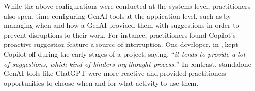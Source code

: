 
While the above configurations were conducted at the systems-level, practitioners also spent time configuring GenAI tools at the application level, such as by managing when and how a GenAI provided them with suggestions in order to prevent disruptions to their work.  For instance, practitioners found Copilot's proactive suggestion feature a source of interruption. One developer, in \cite{16}, kept Copilot off during the early stages of a project, saying, ``\textit{it tends to provide a lot of suggestions, which kind of hinders my thought process.}'' In contrast, standalone GenAI tools like ChatGPT were more reactive and provided practitioners opportunities to choose when and for what activity to use them. 






